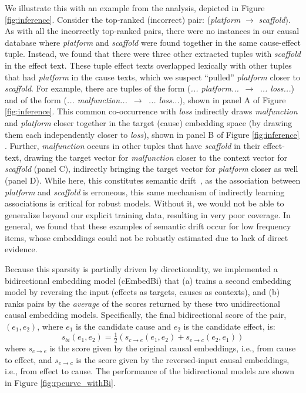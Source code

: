 We illustrate this with an example from the analysis, depicted in Figure \ref{fig:inference}.  Consider the top-ranked (incorrect) pair:  (\emph{platform} $\rightarrow$ \emph{scaffold}).  As with all the incorrectly top-ranked pairs, there were no instances in our causal database where \emph{platform} and \emph{scaffold} were found together in the same cause-effect tuple.  
%
Instead, we found that there were  three other extracted tuples with \emph{scaffold} in the effect text.  
These tuple effect texts overlapped lexically with other tuples that had \textit{platform} in the cause texts, which we suspect ``pulled'' \textit{platform} closer to \textit{scaffold}.
For example, there are tuples of the form (\textit{... platform...}~$\rightarrow$~\textit{... loss...}) and of the form (\textit{... malfunction...}~$\rightarrow$~\textit{... loss...}), shown in panel A of Figure \ref{fig:inference}.    
This common co-occurrence with \textit{loss} indirectly draws \textit{malfunction} and \textit{platform} closer together in the target (cause) embedding space (by drawing them each independently closer to \textit{loss}), shown in panel B of Figure \ref{fig:inference} . 
Further, \textit{malfunction} occurs in other tuples that have \textit{scaffold} in their effect-text, drawing the target vector for \textit{malfunction} closer to the context vector for \textit{scaffold} (panel C), indirectly bringing the target vector for \textit{platform} closer as well (panel D).  While here, this constitutes semantic drift~\citep{curran2007minimising}, as the association between \textit{platform} and \textit{scaffold} is erroneous, this same mechanism of indirectly learning associations is critical for robust models.  Without it, we would not be able to generalize beyond our explicit training data, resulting in very poor coverage.
In general, we found that these examples of semantic drift occur for low frequency items, whose embeddings could not be robustly estimated due to lack of direct evidence.

Because this sparsity is partially driven by directionality, 
we implemented a bidirectional embedding model (cEmbedBi) that (a) trains a second embedding model by reversing the input (effects as targets, causes as contexts), and (b) ranks pairs by the \textit{average} of the scores returned by these two unidirectional causal embedding models. 
Specifically, the final bidirectional score of the pair, $(e_1, e_2)$, where $e_1$ is the candidate cause and $e_2$ is the candidate effect, is:
\begin{equation}
s_{bi}(e_1, e_2) = \tfrac{1}{2}(s_{c{\rightarrow}e}(e_1, e_2) + s_{e \rightarrow c}(e_2, e_1))
\end{equation}
where $s_{c \rightarrow e}$ is the score given by the original causal embeddings, i.e., from cause to effect, and $s_{e \rightarrow c}$ is the score given by the reversed-input causal embeddings, i.e., from effect to cause.  The performance of the bidirectional models are shown in Figure \ref{fig:rpcurve_withBi}.



